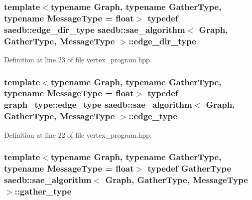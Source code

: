 \hypertarget{classsaedb_1_1sae__algorithm_a0918d4a10cf91f715a686560b5b95b03}{
\subsubsection[{edge\-\_\-dir\-\_\-type}]{\setlength{\rightskip}{0pt plus 5cm}template$<$typename Graph, typename Gather\-Type, typename Message\-Type = float$>$ typedef {\bf saedb\-::edge\-\_\-dir\-\_\-type} {\bf saedb\-::sae\-\_\-algorithm}$<$ Graph, Gather\-Type, Message\-Type $>$\-::{\bf edge\-\_\-dir\-\_\-type}}}\label{d0/d9f/classsaedb_1_1sae__algorithm_a0918d4a10cf91f715a686560b5b95b03}


Definition at line 23 of file vertex\-\_\-program.\-hpp.

\hypertarget{classsaedb_1_1sae__algorithm_aaebb1836596e0efad3d694a5b829871f}{
\subsubsection[{edge\-\_\-type}]{\setlength{\rightskip}{0pt plus 5cm}template$<$typename Graph, typename Gather\-Type, typename Message\-Type = float$>$ typedef {\bf graph\-\_\-type\-::edge\-\_\-type} {\bf saedb\-::sae\-\_\-algorithm}$<$ Graph, Gather\-Type, Message\-Type $>$\-::{\bf edge\-\_\-type}}}\label{d0/d9f/classsaedb_1_1sae__algorithm_aaebb1836596e0efad3d694a5b829871f}


Definition at line 22 of file vertex\-\_\-program.\-hpp.

\hypertarget{classsaedb_1_1sae__algorithm_a4c57e65dd3987f19d5d90bf394c8f2f8}{
\subsubsection[{gather\-\_\-type}]{\setlength{\rightskip}{0pt plus 5cm}template$<$typename Graph, typename Gather\-Type, typename Message\-Type = float$>$ typedef Gather\-Type {\bf saedb\-::sae\-\_\-algorithm}$<$ Graph, Gather\-Type, Message\-Type $>$\-::{\bf gather\-\_\-type}}}\label{d0/d9f/classsaedb_1_1sae__algorithm_a4c57e65dd3987f19d5d90bf394c8f2f8}


